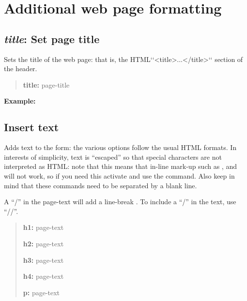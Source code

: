 \documentclass[letterpaper,10pt,english]{sphinxmanual}
\begin{document}
\section{Additional web page formatting}
\label{forms:additional-web-page-formatting}

\subsection{\emph{title}: Set page title}
\label{forms:title-set-page-title}
Sets the title of the web page: that is, the HTML{}`{}`\textless{}title\textgreater{}...\textless{}/title\textgreater{}{}`{}`
section of the header.
\begin{quote}

\begin{DUlineblock}{0em}
\item[] \textbf{title:} page-title
\end{DUlineblock}
\end{quote}

\textbf{Example:}
\begin{quote}

\end{quote}


\subsection{Insert text}
\label{forms:insert-text}
Adds text to the form: the various options follow the usual HTML
formats. In interests of simplicity, text is “escaped” so that special
characters are not interpreted as HTML: note that this means that
in-line mark-up such as ,  and  will not work,
so if you need this activate and use the  command. Also keep in
mind that these commands need to be separated by a blank line.

A “/” in the page-text will add a line-break . To include a
“/” in the text, use “//”.
\begin{quote}

\begin{DUlineblock}{0em}
\item[] \textbf{h1:} page-text
\item[] \textbf{h2:} page-text
\item[] \textbf{h3:} page-text
\item[] \textbf{h4:} page-text
\item[] \textbf{p:} page-text
\end{DUlineblock}
\end{quote}
\end{document}
